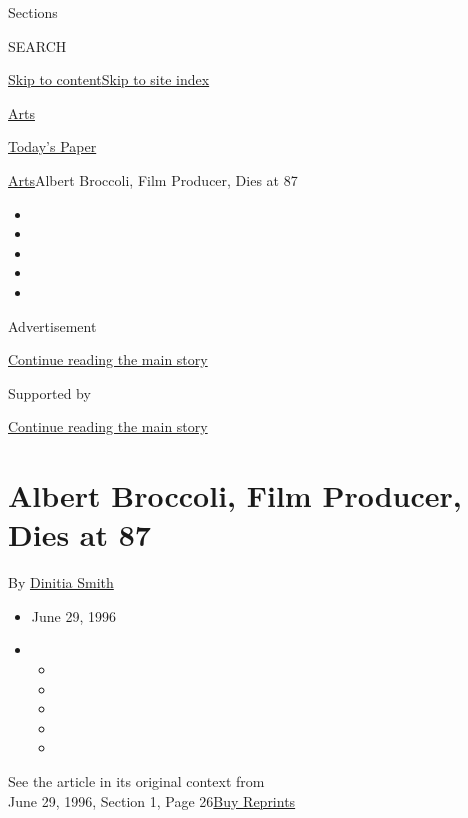 Sections

SEARCH

\protect\hyperlink{site-content}{Skip to
content}\protect\hyperlink{site-index}{Skip to site index}

\href{https://www.nytimes.com/section/arts}{Arts}

\href{https://myaccount.nytimes.com/auth/login?response_type=cookie\&client_id=vi}{}

\href{https://www.nytimes.com/section/todayspaper}{Today's Paper}

\href{/section/arts}{Arts}\textbar{}Albert Broccoli, Film Producer, Dies
at 87

\begin{itemize}
\item
\item
\item
\item
\item
\end{itemize}

Advertisement

\protect\hyperlink{after-top}{Continue reading the main story}

Supported by

\protect\hyperlink{after-sponsor}{Continue reading the main story}

\hypertarget{albert-broccoli-film-producer-dies-at-87}{%
\section{Albert Broccoli, Film Producer, Dies at
87}\label{albert-broccoli-film-producer-dies-at-87}}

By \href{https://www.nytimes.com/by/dinitia-smith}{Dinitia Smith}

\begin{itemize}
\item
  June 29, 1996
\item
  \begin{itemize}
  \item
  \item
  \item
  \item
  \item
  \end{itemize}
\end{itemize}

See the article in its original context from\\
June 29, 1996, Section 1, Page
26\href{https://store.nytimes.com/collections/new-york-times-page-reprints?utm_source=nytimes\&utm_medium=article-page\&utm_campaign=reprints}{Buy
Reprints}

